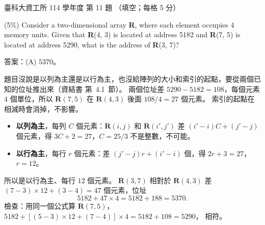 \begin{pastexam}[label={px:ntust-114-ice-11}]{臺科大資工所 114 學年度 第 11 題}
（填空；每格 5 分）

(5\%) Consider a two-dimensional array \textbf{R}, where each element occupies 4 memory units.
Given that \textbf{R}(4, 3) is located at address 5182 and \textbf{R}(7, 5) is located at address
5290, what is the address of \textbf{R}(3, 7)? 
\end{pastexam}

\begin{pastsoln}
答案：(A) $5370$。

題目沒說是以列為主還是以行為主，也沒給陣列的大小和索引的起點，要從兩個已知的位址推出來（資結書
第~4.1~節）。 兩個位址差 $5290 - 5182 = 108$，每個元素 $4$ 個單位，所以 $\mathbf{R}(7,5)$ 在
$\mathbf{R}(4,3)$ 後面 $108 / 4 = 27$ 個元素。 索引的起點在相減時會消掉，不影響。
\begin{itemize}
\item \textbf{以列為主}，每列 $C$ 個元素：$\mathbf{R}(i,j)$ 和 $\mathbf{R}(i',j')$ 差 $(i' - i)C + (j' - j)$
個元素，得 $3C + 2 = 27$，$C = 25/3$ 不是整數，不可能。
\item \textbf{以行為主}，每行 $r$ 個元素：差 $(j' - j)r + (i' - i)$ 個，得 $2r + 3 = 27$，$r = 12$。
\end{itemize}
所以是以行為主、每行 $12$ 個元素。 $\mathbf{R}(3, 7)$ 相對於 $\mathbf{R}(4, 3)$ 差
$(7 - 3) \times 12 + (3 - 4) = 47$ 個元素，位址
\[
5182 + 47 \times 4 = 5182 + 188 = 5370.
\]
檢查：用同一個公式算 $\mathbf{R}(7, 5)$，$5182 + [(5 - 3) \times 12 + (7 - 4)] \times 4 = 5182 + 108 = 5290$，
相符。
\end{pastsoln}
